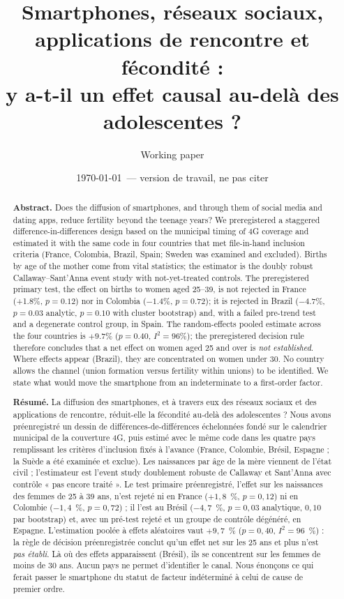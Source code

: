 \documentclass[11pt,a4paper]{article}
\title{Smartphones, réseaux sociaux, applications de rencontre et fécondité :\\
y a-t-il un effet causal au-delà des adolescentes ?}
\author{Working paper}
\date{\today\ --- version de travail, ne pas citer}
\begin{document}
\maketitle

\begin{abstract}
\noindent\textbf{Abstract.} Does the diffusion of smartphones, and through them of social media and dating apps, reduce fertility beyond the teenage years? We preregistered a staggered difference-in-differences design based on the municipal timing of 4G coverage and estimated it with the same code in four countries that met file-in-hand inclusion criteria (France, Colombia, Brazil, Spain; Sweden was examined and excluded). Births by age of the mother come from vital statistics; the estimator is the doubly robust Callaway--Sant'Anna event study with not-yet-treated controls. The preregistered primary test, the effect on births to women aged 25--39, is not rejected in France (+1.8\%, $p=0.12$) nor in Colombia ($-1.4$\%, $p=0.72$); it is rejected in Brazil ($-4.7$\%, $p=0.03$ analytic, $p=0.10$ with cluster bootstrap) and, with a failed pre-trend test and a degenerate control group, in Spain. The random-effects pooled estimate across the four countries is $+9.7$\% ($p=0.40$, $I^2=96$\%); the preregistered decision rule therefore concludes that a net effect on women aged 25 and over is \emph{not established}. Where effects appear (Brazil), they are concentrated on women under 30. No country allows the channel (union formation versus fertility within unions) to be identified. We state what would move the smartphone from an indeterminate to a first-order factor.

\medskip\noindent\textbf{Résumé.} La diffusion des smartphones, et à travers eux des réseaux sociaux et des applications de rencontre, réduit-elle la fécondité au-delà des adolescentes ? Nous avons préenregistré un dessin de différences-de-différences échelonnées fondé sur le calendrier municipal de la couverture 4G, puis estimé avec le même code dans les quatre pays remplissant les critères d'inclusion fixés à l'avance (France, Colombie, Brésil, Espagne ; la Suède a été examinée et exclue). Les naissances par âge de la mère viennent de l'état civil ; l'estimateur est l'event study doublement robuste de Callaway et Sant'Anna avec contrôle « pas encore traité ». Le test primaire préenregistré, l'effet sur les naissances des femmes de 25 à 39 ans, n'est rejeté ni en France ($+1{,}8$~\%, $p=0{,}12$) ni en Colombie ($-1{,}4$~\%, $p=0{,}72$) ; il l'est au Brésil ($-4{,}7$~\%, $p=0{,}03$ analytique, $0{,}10$ par bootstrap) et, avec un pré-test rejeté et un groupe de contrôle dégénéré, en Espagne. L'estimation poolée à effets aléatoires vaut $+9{,}7$~\% ($p=0{,}40$, $I^2=96$~\%) : la règle de décision préenregistrée conclut qu'un effet net sur les 25 ans et plus n'est \emph{pas établi}. Là où des effets apparaissent (Brésil), ils se concentrent sur les femmes de moins de 30 ans. Aucun pays ne permet d'identifier le canal. Nous énonçons ce qui ferait passer le smartphone du statut de facteur indéterminé à celui de cause de premier ordre.
\end{abstract}
\end{document}
